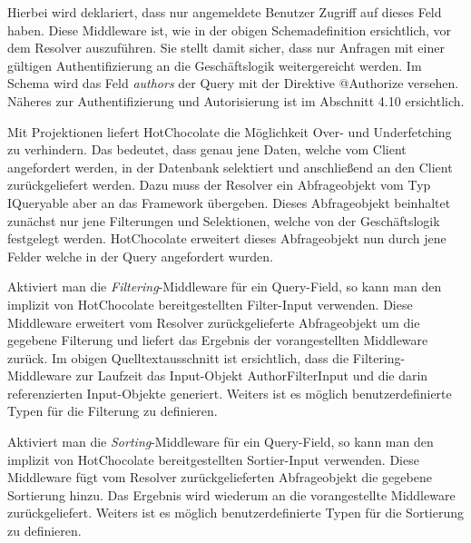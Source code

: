 Hierbei wird deklariert, dass nur angemeldete Benutzer Zugriff auf dieses Feld haben.
Diese Middleware ist, wie in der obigen Schemadefinition ersichtlich, vor dem Resolver auszuführen.
Sie stellt damit sicher, dass nur Anfragen mit einer gültigen Authentifizierung an die Geschäftslogik weitergereicht werden.
Im Schema wird das Feld \textit{authors} der Query mit der Direktive @Authorize versehen.
Näheres zur Authentifizierung und Autorisierung ist im Abschnitt 4.10 ersichtlich.

Mit Projektionen liefert HotChocolate die Möglichkeit Over- und Underfetching zu verhindern.
Das bedeutet, dass genau jene Daten, welche vom Client angefordert werden, in der Datenbank selektiert und anschließend an den Client zurückgeliefert werden.
Dazu muss der Resolver ein Abfrageobjekt vom Typ IQueryable aber an das Framework übergeben.
Dieses Abfrageobjekt beinhaltet zunächst nur jene Filterungen und Selektionen, welche von der Geschäftslogik festgelegt werden.
HotChocolate erweitert dieses Abfrageobjekt nun durch jene Felder welche in der Query angefordert wurden.

Aktiviert man die \textit{Filtering}-Middleware für ein Query-Field, so kann man den implizit von HotChocolate bereitgestellten Filter-Input verwenden.
Diese Middleware erweitert vom Resolver zurückgelieferte Abfrageobjekt um die gegebene Filterung und liefert das Ergebnis der vorangestellten Middleware zurück.
Im obigen Quelltextausschnitt ist ersichtlich, dass die Filtering-Middleware zur Laufzeit das Input-Objekt AuthorFilterInput und die darin referenzierten Input-Objekte generiert.
Weiters ist es möglich benutzerdefinierte Typen für die Filterung zu definieren.

Aktiviert man die \textit{Sorting}-Middleware für ein Query-Field, so kann man den implizit von HotChocolate bereitgestellten Sortier-Input verwenden.
Diese Middleware fügt vom Resolver zurückgelieferten Abfrageobjekt die gegebene Sortierung hinzu.
Das Ergebnis wird wiederum an die vorangestellte Middleware zurückgeliefert.
Weiters ist es möglich benutzerdefinierte Typen für die Sortierung zu definieren.

